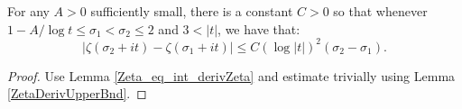 \begin{lemma}
\label{Zeta_diff_Bnd}
\leanok
For any $A>0$ sufficiently small, there is a constant $C>0$ so that
  whenever $1- A / \log t \le \sigma_1 < \sigma_2\le 2$ and $3 < |t|$, we have that:
  $$
  |\zeta (\sigma_2 + it) - \zeta (\sigma_1 + it)|
  \le C (\log |t|)^2 (\sigma_2 - \sigma_1).
  $$
\end{lemma}
\begin{proof}
\leanok
Use Lemma \ref{Zeta_eq_int_derivZeta} and
  estimate trivially using Lemma \ref{ZetaDerivUpperBnd}.
\end{proof}
